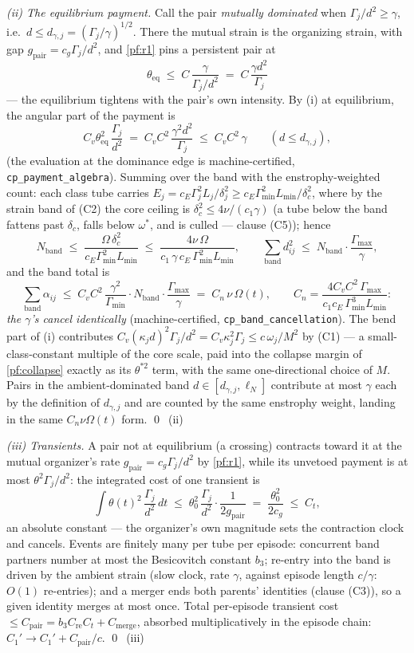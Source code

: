 \documentclass[11pt,letterpaper]{amsart}
\theoremstyle{definition}
\theoremstyle{remark}
\newcommand{\om}{\omega}
\begin{document}
\emph{(ii) The equilibrium payment.} Call the pair \emph{mutually dominated} when
$\Gamma_j/d^2\ge\gamma$, i.e.\ $d\le d_{\gamma,j}=(\Gamma_j/\gamma)^{1/2}$. There the
mutual strain is the organizing strain, with gap $g_{\mathrm{pair}}=c_g\Gamma_j/d^2$,
and \cref{pf:r1} pins a persistent pair at
\[
\theta_{\mathrm{eq}}\;\le\;C\,\frac{\gamma}{\Gamma_j/d^2}\;=\;C\,\frac{\gamma d^2}{\Gamma_j}
\]
--- the equilibrium tightens with the pair's own intensity. By (i) at equilibrium,
the angular part of the payment is
\[
C_v\theta_{\mathrm{eq}}^2\,\frac{\Gamma_j}{d^2}
\;=\;C_vC^2\,\frac{\gamma^2d^2}{\Gamma_j}
\;\le\;C_vC^2\,\gamma\qquad(d\le d_{\gamma,j}),
\]
(the evaluation at the dominance edge is machine-certified,
\texttt{cp\_payment\_algebra}). Summing over the band with the enstrophy-weighted
count: each class tube carries $E_j=c_E\Gamma_j^2L_j/\delta_j^2\ge
c_E\Gamma_{\min}^2L_{\min}/\delta_c^2$, where by the strain band of (C2) the core
ceiling is $\delta_c^2\le4\nu/(c_1\gamma)$ (a tube below the band fattens past
$\delta_c$, falls below $\om^*$, and is culled --- clause (C5)); hence
\[
N_{\mathrm{band}}\;\le\;\frac{\Omega\,\delta_c^2}{c_E\Gamma_{\min}^2L_{\min}}
\;\le\;\frac{4\nu\,\Omega}{c_1\,\gamma\,c_E\,\Gamma_{\min}^2L_{\min}},
\qquad
\sum_{\mathrm{band}}d_{ij}^2\;\le\;N_{\mathrm{band}}\cdot\frac{\Gamma_{\max}}{\gamma},
\]
and the band total is
\[
\sum_{\mathrm{band}}\alpha_{ij}
\;\le\;C_vC^2\,\frac{\gamma^2}{\Gamma_{\min}}\cdot
N_{\mathrm{band}}\cdot\frac{\Gamma_{\max}}{\gamma}
\;=\;C_n\,\nu\,\Omega(t),
\qquad
C_n=\frac{4C_vC^2\,\Gamma_{\max}}{c_1c_E\,\Gamma_{\min}^3L_{\min}} :
\]
\emph{the $\gamma$'s cancel identically} (machine-certified,
\texttt{cp\_band\_cancellation}). The bend part of (i) contributes
$C_v(\kappa_jd)^2\Gamma_j/d^2=C_v\kappa_j^2\Gamma_j\le c\,\om_j/M^2$ by (C1) --- a
small-class-constant multiple of the core scale, paid into the collapse margin of
\cref{pf:collapse} exactly as its $\theta^{*2}$ term, with the same one-directional
choice of $M$. Pairs in the ambient-dominated band
$d\in[d_{\gamma,j},\ell_N]$ contribute at most $\gamma$ each by the definition of
$d_{\gamma,j}$ and are counted by the same enstrophy weight, landing in the same
$C_n\nu\Omega(t)$ form. \qed\ (ii)

\emph{(iii) Transients.} A pair not at equilibrium (a crossing) contracts toward it
at the mutual organizer's rate $g_{\mathrm{pair}}=c_g\Gamma_j/d^2$ by \cref{pf:r1},
while its unvetoed payment is at most $\theta^2\Gamma_j/d^2$: the integrated cost of
one transient is
\[
\int\theta(t)^2\,\frac{\Gamma_j}{d^2}\,dt
\;\le\;\theta_0^2\,\frac{\Gamma_j}{d^2}\cdot\frac{1}{2g_{\mathrm{pair}}}
\;=\;\frac{\theta_0^2}{2c_g}\;\le\;C_t ,
\]
an absolute constant --- the organizer's own magnitude sets the contraction clock and
cancels. Events are finitely many per tube per episode: concurrent band partners
number at most the Besicovitch constant $b_3$; re-entry into the band is driven by
the ambient strain (slow clock, rate $\gamma$, against episode length $c/\gamma$:
$O(1)$ re-entries); and a merger ends both parents' identities (clause (C3)), so a
given identity merges at most once. Total per-episode transient cost
$\le C_{\mathrm{pair}}=b_3C_{\mathrm{re}}C_t+C_{\mathrm{merge}}$, absorbed
multiplicatively in the episode chain: $C_1'\to C_1'+C_{\mathrm{pair}}/c$. \qed\ (iii)
\end{document}
